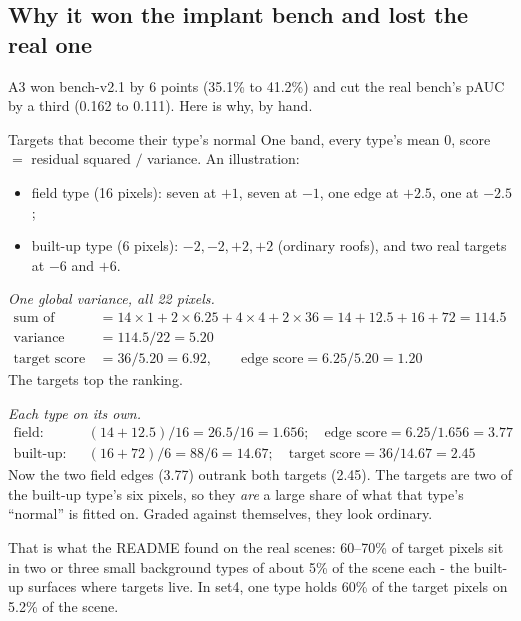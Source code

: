 \subsection{Why it won the implant bench and lost the real one}

A3 won bench-v2.1 by 6 points (35.1\% to 41.2\%) and cut the real bench's pAUC by a third (0.162 to 0.111). Here is why, by
hand.

\begin{worked}[label={we:scoringgains:types}]{Targets that become their type's normal}
One band, every type's mean 0, score $=$ residual squared $/$ variance. An illustration\tagA:
\begin{itemize}
\item field type (16 pixels): seven at $+1$, seven at $-1$, one edge at $+2.5$, one at $-2.5$;
\item built-up type (6 pixels): $-2, -2, +2, +2$ (ordinary roofs), and two real targets at $-6$ and $+6$.
\end{itemize}
\emph{One global variance, all 22 pixels.}
\begin{align*}
\text{sum of squares} &= 14 \times 1 + 2 \times 6.25 + 4 \times 4 + 2 \times 36 = 14 + 12.5 + 16 + 72 = 114.5\\
\text{variance} &= 114.5 / 22 = 5.20\\
\text{target score} &= 36 / 5.20 = 6.92, \qquad \text{edge score} = 6.25 / 5.20 = 1.20
\end{align*}
The targets top the ranking.

\emph{Each type on its own.}
\begin{align*}
\text{field:}\quad & (14 + 12.5)/16 = 26.5 / 16 = 1.656; \quad \text{edge score} = 6.25 / 1.656 = 3.77\\
\text{built-up:}\quad & (16 + 72)/6 = 88 / 6 = 14.67; \quad \text{target score} = 36 / 14.67 = 2.45
\end{align*}
Now the two field edges (3.77) outrank both targets (2.45). The targets are two of the built-up type's six pixels, so they
\emph{are} a large share of what that type's ``normal'' is fitted on. Graded against themselves, they look ordinary.
\end{worked}

That is what the README found on the real scenes: 60--70\% of target pixels sit in two or three small background types of
about 5\% of the scene each - the built-up surfaces where targets live. In set4, one type holds 60\% of the target pixels on
5.2\% of the scene.

